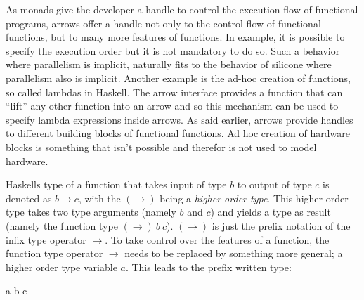 \documentclass[11pt,final,a4paper]{article}
\newcommand{\hs}[1]{%
  \lstinline[
    fancyvrb=true, columns=flexible, language=haskell,
    captionpos=b,
    basicstyle=\ttfamily\setstretch{1},
    commentstyle=\color{ggray}\slshape,
    upquote=true,
    emph={True,False}, emphstyle=\color{green},
    literate=*{...}{{\textcolor{ggray}{...}}}{3}%
             {\{}{{\textcolor{blue}{\{}}}{1}%
             {\}}{{\textcolor{blue}{\}}}}{1}%
             {->}{{$\rightarrow$ }}{2},
    stringstyle=\color{red}, showstringspaces=false,
    keywordstyle=\color{blue}]!#1!%
}
\begin{document}
As monads give the developer a handle to control the execution flow of functional programs, arrows offer a handle not only to the control
flow of functional functions, but to many more features of functions. In example, it is possible to specify the execution order but it is
not mandatory to do so. Such a behavior where parallelism is implicit, naturally fits to the behavior of silicone where parallelism also is
implicit. Another example is the ad-hoc creation of functions, so called lambdas in Haskell. The arrow interface provides a function that
can ``lift'' any other function into an arrow and so this mechanism can be used to specify lambda expressions inside arrows. As said
earlier, arrows provide handles to different building blocks of functional functions. Ad hoc creation of hardware blocks is something that
isn't possible and therefor is not used to model hardware. %



Haskells type of a function that takes input of type $b$ to output of type $c$ is denoted as $b \rightarrow c$, with the $(\rightarrow)$
being a \emph{higher-order-type}. This higher order type takes two type arguments (namely $b$ and $c$) and yields a type as result (namely
the function type $(\rightarrow)\ b\ c$). $(\rightarrow)$ is just the prefix notation of the infix type operator $\rightarrow$. To take
control over the features of a function, the function type operator $\rightarrow$ needs to be replaced by something more general; a higher
order type variable $a$. This leads to the prefix written type:

\begin{center}
\begin{minipage}{.2\textwidth}
\begin{haskell}
a b c
\end{haskell}
\end{minipage} \end{center}
\end{document}
